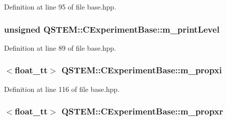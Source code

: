 Definition at line 95 of file base.\-hpp.

\hypertarget{class_q_s_t_e_m_1_1_c_experiment_base_a6d9d825daf4021a868e29afaea0aee9e}{
\subsubsection[{m\-\_\-print\-Level}]{\setlength{\rightskip}{0pt plus 5cm}unsigned Q\-S\-T\-E\-M\-::\-C\-Experiment\-Base\-::m\-\_\-print\-Level\hspace{0.3cm}{\ttfamily [protected]}}}\label{class_q_s_t_e_m_1_1_c_experiment_base_a6d9d825daf4021a868e29afaea0aee9e}


Definition at line 89 of file base.\-hpp.

\hypertarget{class_q_s_t_e_m_1_1_c_experiment_base_a31f1aa1dd9fedb2e737e2bc0583ade11}{
\subsubsection[{m\-\_\-propxi}]{$<${\bf float\-\_\-tt}$>$ Q\-S\-T\-E\-M\-::\-C\-Experiment\-Base\-::m\-\_\-propxi\hspace{0.3cm}{\ttfamily [protected]}}}\label{class_q_s_t_e_m_1_1_c_experiment_base_a31f1aa1dd9fedb2e737e2bc0583ade11}


Definition at line 116 of file base.\-hpp.

\hypertarget{class_q_s_t_e_m_1_1_c_experiment_base_add82c2009256d477d809696d584d4f44}{
\subsubsection[{m\-\_\-propxr}]{$<${\bf float\-\_\-tt}$>$ Q\-S\-T\-E\-M\-::\-C\-Experiment\-Base\-::m\-\_\-propxr\hspace{0.3cm}{\ttfamily [protected]}}}\label{class_q_s_t_e_m_1_1_c_experiment_base_add82c2009256d477d809696d584d4f44}


